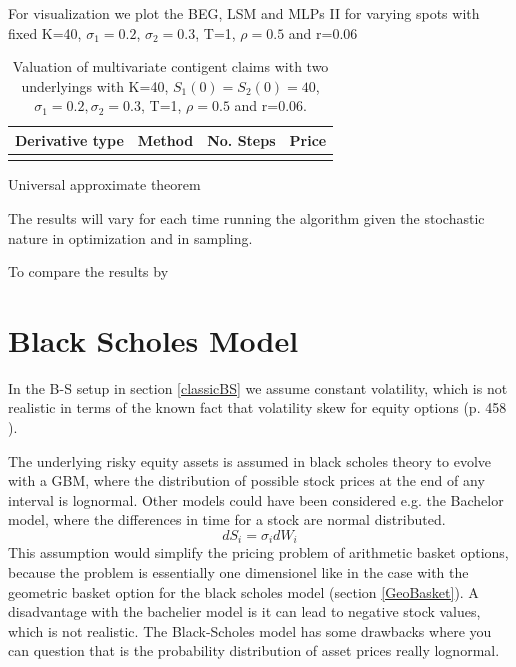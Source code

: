 For visualization we plot the BEG, LSM and MLPs II for varying spots with fixed K=40, $\sigma_1=0.2$, $\sigma_2=0.3$, T=1, $\rho=0.5$  and r=0.06


\begin{table}[th]
\caption{Valuation of multivariate contigent claims with two underlyings with K=40, $S_1(0)=S_2(0)=40$, $\sigma_1=0.2, \sigma_2=0.3$, T=1, $\rho=0.5$  and r=0.06.}
\label{tab:PriceAmericanPut}
\centering
\begin{tabular}{l l l l}
\toprule
\textbf{Derivative type} & \textbf{Method} & \textbf{No. Steps} & \textbf{Price} \\
\midrule
\bottomrule\\
\end{tabular}
\end{table}





Universal approximate theorem

The results will vary for each time running the algorithm given the stochastic nature in optimization and in sampling.


To compare the results by 


\parencite{liaw2018tune}

\section{Black Scholes Model}
In the B-S setup in section \ref{classicBS} we assume constant volatility, which is not realistic in terms of the known fact that volatility skew for equity options (p. 458 \parencite{Hull}).

The underlying risky equity assets is assumed in black scholes theory to evolve with a GBM, where the distribution of possible stock prices at the end of any interval is lognormal. Other models could have been considered e.g. the Bachelor model, where the differences in time for a stock are normal distributed. 
\begin{equation*}
dS_i=\sigma_i dW_i
\end{equation*}
This assumption would simplify the pricing problem of arithmetic basket options, because the problem is essentially one dimensionel like in the case with the geometric basket option for the black scholes model (section \ref{GeoBasket}). A disadvantage with the bachelier model is it can lead to negative stock values, which is not realistic. The Black-Scholes model has some drawbacks where you can question that is the probability distribution of asset prices really lognormal. \\

